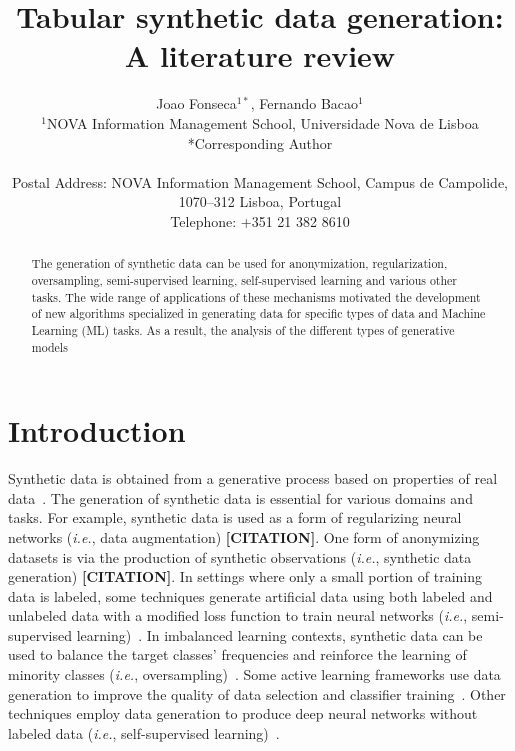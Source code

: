 \documentclass[parskip=full]{scrartcl}
\title{Tabular synthetic data generation: A literature review}
\author{%
	Joao Fonseca\(^{1*}\), Fernando Bacao\(^{1}\)
	\\
	\small{\(^{1}\)NOVA Information Management School, Universidade Nova de Lisboa}
	\\
	\small{*Corresponding Author}
	\\
	\\
	\small{Postal Address: NOVA Information Management School, Campus de
    Campolide, 1070--312 Lisboa, Portugal}
	\\
	\small{Telephone: +351 21 382 8610}
}
\date{}
\begin{document}
\maketitle
\linenumbers

\begin{abstract}

    The generation of synthetic data can be used for anonymization,
    regularization, oversampling, semi-supervised learning, self-supervised
    learning and various other tasks. The wide range of applications of these
    mechanisms motivated the development of new algorithms specialized in
    generating data for specific types of data and Machine Learning (ML)
    tasks. As a result, the analysis of the different types of generative
    models 



\end{abstract}

\section{Introduction}\label{sec:introduction}

Synthetic data is obtained from a generative process based on properties of
real data~\cite{assefa2020generating}. The generation of synthetic data is
essential for various domains and tasks. For example, synthetic data is used
as a form of regularizing neural networks (\textit{i.e.}, data augmentation)
\textbf{[CITATION]}. One form of anonymizing datasets is via the production of
synthetic observations (\textit{i.e.}, synthetic data generation)
\textbf{[CITATION]}. In settings where only a small portion of training data
is labeled, some techniques generate artificial data using both labeled and
unlabeled data with a modified loss function to train neural networks
(\textit{i.e.}, semi-supervised learning)~\cite{laine2017temporal}. In
imbalanced learning contexts, synthetic data can be used to balance the target
classes' frequencies and reinforce the learning of minority classes
(\textit{i.e.}, oversampling)~\cite{fonseca2021improving}. Some active
learning frameworks use data generation to improve the quality of data
selection and classifier training~\cite{kim2021lada}. Other techniques employ
data generation to produce deep neural networks without labeled data
(\textit{i.e.}, self-supervised learning)~\cite{grill2020bootstrap}.
\end{document}
